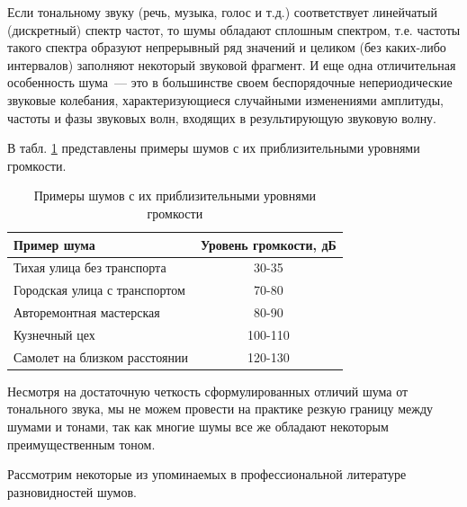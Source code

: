 \documentclass[oneside, final, 14pt]{extreport}
\begin{document}
Если тональному звуку (речь, музыка, голос и т.д.) соответствует линейчатый (дискретный) спектр частот, то шумы обладают сплошным спектром, т.е. частоты такого спектра образуют непрерывный ряд значений и целиком (без каких-либо интервалов) заполняют некоторый звуковой фрагмент. И еще одна отличительная особенность шума~--- это в большинстве своем беспорядочные непериодические звуковые колебания, характеризующиеся случайными изменениями амплитуды, частоты и фазы звуковых волн, входящих в результирующую звуковую волну. 

В табл. \ref{table-noise-01} представлены примеры шумов с их приблизительными уровнями громкости.

\begin{table}[h]
  \caption{Примеры шумов с их приблизительными уровнями громкости}
  \begin{center}
  \begin{tabular}{|l|c|}
  \hline Пример шума & Уровень громкости, дБ \\
  \hline Тихая улица без транспорта & 30-35 \\
  \hline Городская улица с транспортом & 70-80 \\  
  \hline Авторемонтная мастерская & 80-90 \\  
  \hline Кузнечный цех & 100-110 \\    
  \hline Самолет на близком расстоянии & 120-130 \\   
  \hline   
  \end{tabular}
  \end{center}  
  \label{table-noise-01}
\end{table}

Несмотря на достаточную четкость сформулированных отличий шума от тонального звука, мы не можем провести на практике резкую границу между шумами и тонами, так как многие шумы все же обладают некоторым преимущественным тоном.

Рассмотрим некоторые из упоминаемых в профессиональной литературе разновидностей шумов.
\end{document}
